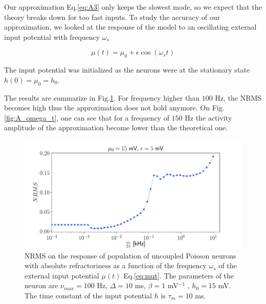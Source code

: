 \documentclass[12pt,twoside]{report}
\begin{document}
Our approximation Eq.\eqref{eq:A3} only keeps the slowest mode, so we expect that the theory breaks down for too fast inputs. To study the accuracy of our approximation, we looked at the response of the model to an oscillating external input potential with frequency $\omega_s$ 

\begin{equation}
\label{eq:mut}
\mu(t)=\mu_0 + \epsilon \cos(\omega_st)
\end{equation}

The input potential was initialized as the neurons were at the stationary state $h(0)=\mu_0=h_0$. 

The results are summarize in Fig.\ref{fig:NRMSo}. For frequency higher than $100$ Hz, the NRMS becomes high thus the approximation does not hold anymore. On  Fig.\ref{fig:A_omega_t}, one can see that for a frequency of $150$ Hz the activity amplitude of the approximation become lower than the theoretical one.

\begin{figure}[h!]
	\centering
	\includegraphics[width=0.8\linewidth]{NRMSo.pdf}
	\caption{NRMS on the response of population of uncoupled Poisson neurons with absolute refractoriness as a function of the frequency $\omega_s$ 
		of the external input potential $\mu(t)$ Eq.\eqref{eq:mut}. The parameters of the neuron are $\nu_{max}=100$ Hz, $\Delta=10$ ms, $\beta=1$ mV$^{-1}$ , $h_0=15$ mV. The time constant of the input potential $h$ is $\tau_m=10$ ms.
	}
	\label{fig:NRMSo}
\end{figure}
\end{document}
